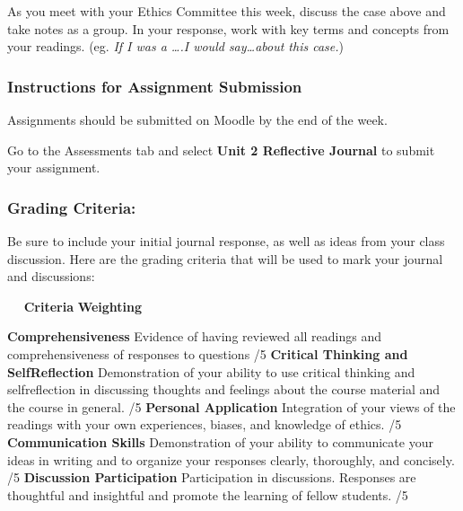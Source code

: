 \documentclass[
]{book}
\begin{document}
\begin{assessment}
As you meet with your Ethics Committee this week, discuss the case above and
take notes as a group. In your response, work with key terms and concepts from
your readings. (eg. \emph{If I was a \ldots.I would say\ldots about this case.})
\end{assessment}

\hypertarget{instructions-for-assignment-submission-1}{%
\subsubsection*{Instructions for Assignment Submission}\label{instructions-for-assignment-submission-1}}

Assignments should be submitted on Moodle by the end of the week.

Go to the Assessments tab and select \textbf{Unit 2 Reflective Journal} to submit your assignment.

\hypertarget{grading-criteria}{%
\subsubsection*{Grading Criteria:}\label{grading-criteria}}

Be sure to include your initial journal response, as well as ideas from your class
discussion. Here are the grading criteria that will be used to mark your journal and
discussions:

~~\textbar{} \textbf{Criteria}\textbar{} \textbf{Weighting} \textbar{}

\textbar\textbar\textbar\textbar{}
\textbar{} \textbf{Comprehensiveness}\textbar{} Evidence of having reviewed all readings and comprehensiveness of responses to questions\textbar{} /5\textbar{}
\textbar{} \textbf{Critical Thinking and SelfReflection} \textbar{} Demonstration of your ability to use critical thinking and selfreflection in discussing thoughts and feelings about the course material and the course in general. \textbar{} /5\textbar{}
\textbar{} \textbf{Personal Application} \textbar{} Integration of your views of the readings with your own experiences, biases, and knowledge of ethics.\textbar{} /5\textbar{}
\textbar{} \textbf{Communication Skills} \textbar{} Demonstration of your ability to communicate your ideas in writing and to organize your responses clearly, thoroughly, and concisely. \textbar{} /5\textbar{}
\textbar{} \textbf{Discussion Participation} \textbar{} Participation in discussions. Responses are thoughtful and insightful and promote the learning of fellow students. \textbar{} /5\textbar{}
\end{document}
